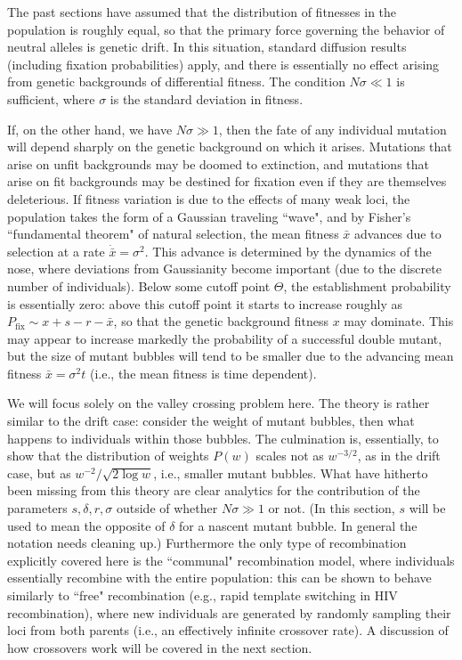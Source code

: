 \documentclass[10pt]{revtex4}
\begin{document}
The past sections have assumed that the distribution of fitnesses in the population is roughly equal, so that the primary force governing the behavior of neutral alleles is genetic drift.
In this situation, standard diffusion results (including fixation probabilities) apply, and there is essentially no effect arising from genetic backgrounds of differential fitness.
The condition $N\sigma \ll 1$ is sufficient, where $\sigma$ is the standard deviation in fitness.

If, on the other hand, we have $N\sigma \gg 1$, then the fate of any individual mutation will depend sharply on the genetic background on which it arises.
Mutations that arise on unfit backgrounds may be doomed to extinction, and mutations that arise on fit backgrounds may be destined for fixation even if they are themselves deleterious.
If fitness variation is due to the effects of many weak loci, the population takes the form of a Gaussian traveling ``wave", and by Fisher's ``fundamental theorem" of natural selection, the mean fitness $\bar{x}$ advances due to selection at a rate $\dot{\bar{x}} = \sigma^2$.
This advance is determined by the dynamics of the nose, where deviations from Gaussianity become important (due to the discrete number of individuals).
Below some cutoff point $\Theta$, the establishment probability is essentially zero: above this cutoff point it starts to increase roughly as $P_\mathrm{fix} \sim x+s-r-\bar{x}$, so that the genetic background fitness $x$ may dominate.
This may appear to increase markedly the probability of a successful double mutant, but the size of mutant bubbles will tend to be smaller due to the advancing mean fitness $\bar{x} = \sigma^2t$ (i.e., the mean fitness is time dependent).

We will focus solely on the valley crossing problem here.
The theory is rather similar to the drift case: consider the weight of mutant bubbles, then what happens to individuals within those bubbles.
The culmination is, essentially, to show that the distribution of weights $P(w)$ scales not as $w^{-3/2}$, as in the drift case, but as $w^{-2}/\sqrt{2 \log w}$, i.e., smaller mutant bubbles.
What have hitherto been missing from this theory are clear analytics for the contribution of the parameters $s, \delta, r, \sigma$ outside of whether $N\sigma \gg 1$ or not.
(In this section, $s$ will be used to mean the opposite of $\delta$ for a nascent mutant bubble.
In general the notation needs cleaning up.)
Furthermore the only type of recombination explicitly covered here is the ``communal" recombination model, where individuals essentially recombine with the entire population: this can be shown to behave similarly to ``free" recombination (e.g., rapid template switching in HIV recombination), where new individuals are generated by randomly sampling their loci from both parents (i.e., an effectively infinite crossover rate).
A discussion of how crossovers work will be covered in the next section.
\end{document}
